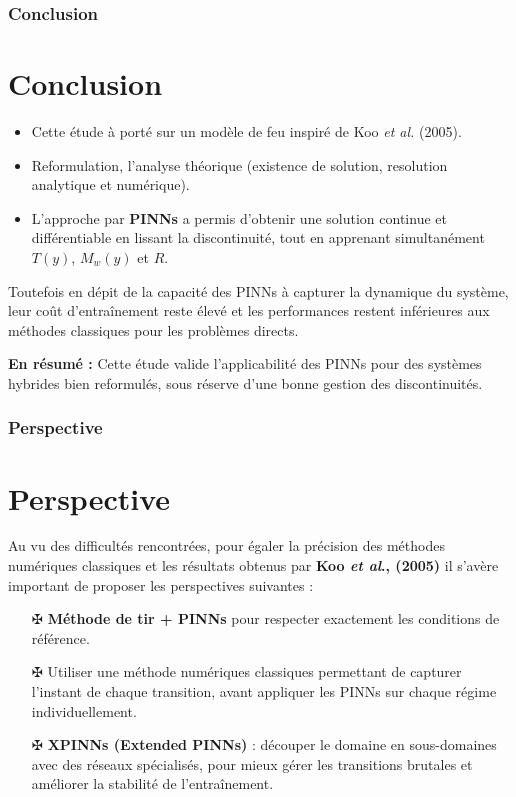 \documentclass[handout]{beamer}
\newtheorem{pbm et hypo}[thm]{Problématique et hypothèses}
\begin{document}
	
	\begin{frame}
		\frametitle{Conclusion}
		\section{Conclusion}
		\begin{itemize}
			\item Cette étude à porté sur un modèle de feu  inspiré de Koo \textit{et al.} (2005).
			\item Reformulation, l'analyse théorique (existence de solution, resolution analytique et numérique).
			\item L'approche par \textbf{PINNs} a permis d'obtenir une solution continue et différentiable en lissant la discontinuité, tout en apprenant simultanément $T(y)$, $M_w(y)$ et $R$.
		\end{itemize}
		\vspace{0.2cm}
		Toutefois en dépit de la capacité des PINNs à capturer la dynamique du système, leur coût d'entraînement reste élevé et les performances restent inférieures aux méthodes classiques pour les problèmes directs.
		
		\vspace{0.4cm}
		\textbf{En résumé :} Cette étude valide l'applicabilité des PINNs pour des systèmes hybrides bien reformulés, sous réserve d’une bonne gestion des discontinuités.
		
	\end{frame}
	
	\begin{frame}
		\frametitle{Perspective}
		\section{Perspective}
		Au vu des difficultés rencontrées, pour égaler la précision des méthodes numériques classiques et les résultats obtenus par \textbf{Koo \textit{et al}., (2005)} il s'avère important de proposer les perspectives suivantes : 
		
		\begin{itemize}
			\item[$\maltese$] \textbf{Méthode de tir + PINNs} pour respecter exactement les conditions de référence. 
			\item[$ \maltese$]	Utiliser une méthode  numériques classiques permettant de capturer l'instant de chaque transition, avant appliquer les PINNs sur chaque régime individuellement. 
			\item[$\maltese$] \textbf{XPINNs (Extended PINNs)} : découper le domaine en sous-domaines avec des réseaux spécialisés, pour mieux gérer les transitions brutales et améliorer la stabilité de l'entraînement.
		\end{itemize}
	\end{frame}
	
\end{document}
